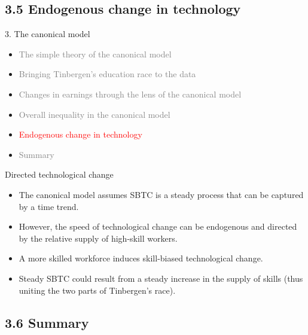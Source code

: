 \documentclass[notes=show]{beamer}
\begin{document}
\subsection{3.5 Endogenous change in technology}

\begin{frame}{3. The canonical model}
\begin{itemize}
\item[\textcolor{gray}{3.1}] \textcolor{gray}{The simple theory of the canonical model} \medskip
\item[\textcolor{gray}{3.2}] \textcolor{gray}{Bringing Tinbergen's education race to the data} \medskip
\item[\textcolor{gray}{3.3}] \textcolor{gray}{Changes in earnings through the lens of the canonical model} \medskip
\item[\textcolor{gray}{3.4}] \textcolor{gray}{Overall inequality in the canonical model} \medskip
\item[\textcolor{red}{3.5}] \textcolor{red}{Endogenous change in technology} \medskip
\item[\textcolor{gray}{3.6}] \textcolor{gray}{Summary}
\end{itemize}
\end{frame}

\begin{frame}{Directed technological change}
\begin{itemize}
\item The canonical model assumes SBTC is a steady process that can be captured by a time trend. \medskip
\item However, the speed of technological change can be endogenous and directed by the relative supply of high-skill workers. \medskip
\item A more skilled workforce induces skill-biased technological change. \medskip
\item Steady SBTC could result from a steady increase in the supply of skills (thus uniting the two parts of Tinbergen's race). 
\end{itemize}
\end{frame}

\subsection{3.6 Summary}
\end{document}
